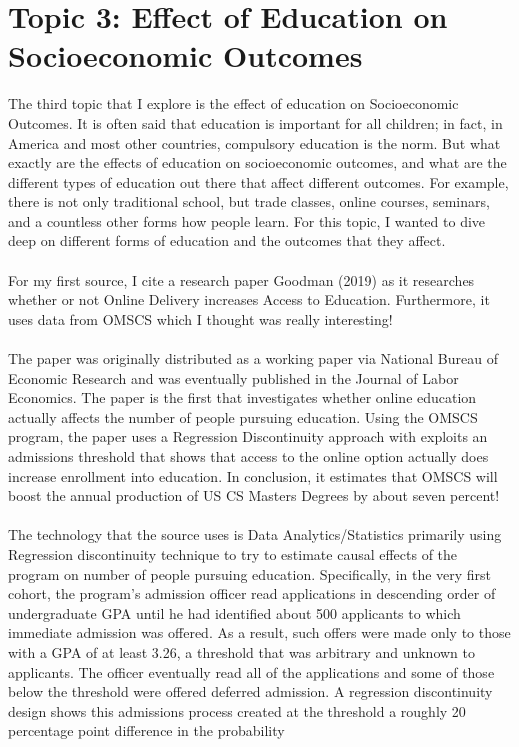 \documentclass[12pt, final]{article}
\begin{document}
\section{Topic 3: Effect of Education on Socioeconomic Outcomes}
\label{Topic 3}
The third topic that I explore is the effect of education on Socioeconomic Outcomes. It is often said that education is important for all children; in fact, in America and most other countries, compulsory education is the norm. But what exactly are the effects of education on socioeconomic outcomes, and what are the different types of education out there that affect different outcomes. For example, there is not only traditional school, but trade classes, online courses, seminars, and a countless other forms how people learn. For this topic, I wanted to dive deep on different forms of education and the outcomes that they affect.
\\
\\
For my first source, I cite a research paper Goodman (2019) \cite{Goodman} as it researches whether or not Online Delivery increases Access to Education. Furthermore, it uses data from OMSCS which I thought was really interesting!
\\
\\
The paper was originally distributed as a working paper via National Bureau of Economic Research and was eventually published in the Journal of Labor Economics. The paper is the first that investigates whether online education actually affects the number of people pursuing education. Using the OMSCS program, the paper uses a Regression Discontinuity approach with exploits an admissions threshold that shows that access to the online option actually does increase enrollment into education. In conclusion, it estimates that OMSCS will boost the annual production of US CS Masters Degrees by about seven percent!
\\
\\
The technology that the source uses is Data Analytics/Statistics primarily using Regression discontinuity technique to try to estimate causal effects of the program on number of people pursuing education. Specifically, in the very first cohort, the program's  admission officer read applications in descending order of undergraduate GPA until he had identified about 500 applicants to which immediate admission was offered. As a result, such offers were made only to those with a GPA of at least 3.26, a threshold that was arbitrary and unknown to applicants. The officer eventually read all of the applications and some of those below the threshold were offered deferred admission. A regression discontinuity design shows this admissions process created at the threshold a roughly 20 percentage point difference in the probability
\end{document}
